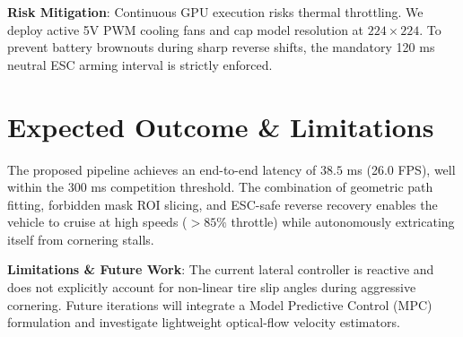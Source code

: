 \documentclass[conference]{IEEEtran}
\begin{document}
\textbf{Risk Mitigation}: Continuous GPU execution risks thermal throttling. We deploy active 5V PWM cooling fans and cap model resolution at $224 \times 224$. To prevent battery brownouts during sharp reverse shifts, the mandatory 120 ms neutral ESC arming interval is strictly enforced.

\section{Expected Outcome \& Limitations}
The proposed pipeline achieves an end-to-end latency of $38.5$ ms (26.0 FPS), well within the 300 ms competition threshold. The combination of geometric path fitting, forbidden mask ROI slicing, and ESC-safe reverse recovery enables the vehicle to cruise at high speeds ($>85\%$ throttle) while autonomously extricating itself from cornering stalls.

\textbf{Limitations \& Future Work}: The current lateral controller is reactive and does not explicitly account for non-linear tire slip angles during aggressive cornering. Future iterations will integrate a Model Predictive Control (MPC) formulation and investigate lightweight optical-flow velocity estimators.



\end{document}
